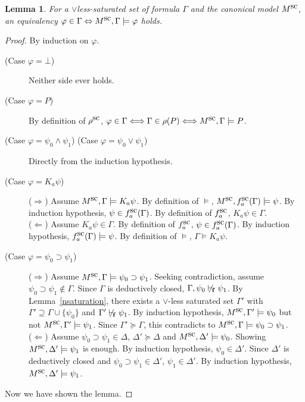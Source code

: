 \documentclass[doctor]{iscs-thesis}
\newtheorem{lemma}{Lemma}
\begin{document}
\begin{lemma}
\label{exactn}
 For a $\vee$less-saturated set of formula $\Gamma$ and the canonical model $M^{\mbox{sc}}$\kern -2pt,
 an equivalency $\varphi\in\Gamma\Leftrightarrow M^{\mbox{sc}}, \Gamma\models\varphi$ holds.
\end{lemma}
\begin{proof}
 By induction on $\varphi$.
\begin{description}
 \item[(Case $\varphi=\bot$)] Neither side ever holds.
 \item[(Case $\varphi =P$)]
	    By definition of $\rho^{\mbox{sc}}$\kern -2pt, 
	    $\varphi\in\Gamma\Longleftrightarrow\Gamma\in\rho(P)\Longleftrightarrow
	    M^{\mbox{sc}},\Gamma\models P$.
 \item[(Case $\varphi = \psi_0\wedge\psi_1$) (Case $\varphi = \psi_0\vee\psi_1$)] 
	    Directly from the induction hypothesis.
 \item[(Case $\varphi ={K_a} \psi$)]
	    \newcommand{\modelion}[2]{\canon M, #1\models #2}
	    ($\Rightarrow$) Assume $\modelion \Gamma {{K_a}\psi}$.
	    By definition of $\models$, $\modelion {\canon f_a(\Gamma)} \psi$.
	    By induction hypothesis, $\psi\in f^{\mbox{sc}}_a(\Gamma)$.
	    By definition of $f^{\mbox{sc}}_a$, ${K_a}\psi\in\Gamma$.\\
	    ($\Leftarrow$)
	    Assume ${K_a}\psi\in\Gamma$.
	    By definition of $f^{\mbox{sc}}_a$, $\psi\in f^{\mbox{sc}}_a(\Gamma)$.
	    By induction hypothesis, $f^{\mbox{sc}}_a(\Gamma)\models \psi$.
	    By definition of $\models$, $\Gamma\models{K_a}\psi$.
 \item[(Case $\varphi = \psi_0\supset\psi_1$)]
	    ($\Rightarrow$) Assume $\modelion \Gamma {\psi_0\supset\psi_1}$.
	    Seeking contradiction, assume $\psi_0\supset\psi_1\notin \Gamma$.
	    Since $\Gamma$ is deductively closed, $\Gamma,\psi_0\not\vdash_{\kern -1pt\mathbf f}\psi_1$.
	    By Lemma~\ref{nsaturation}, there exists a $\vee$-less saturated set $\Gamma'$ with
	    $\Gamma'\supseteq \Gamma\cup \{\psi_0\}$ and $\Gamma'\not\vdash_{\kern -1pt\mathbf f}\psi_1$.
	    By induction hypothesis, $\modelion {\Gamma'} {\psi_0}$ but not
	    $\modelion{\Gamma'}{\psi_1}$.
	    Since $\Gamma'\succeq\Gamma$,
	    this contradicts to $\modelion \Gamma {\psi_0\supset\psi_1}$.\\
	    ($\Leftarrow$)
	    Assume $\psi_0\supset\psi_1\in\Delta$,
	    $\Delta'\succeq \Delta$ and $\modelion {\Delta'}{\psi_0}$.
	    Showing $\modelion {\Delta'}{\psi_1}$ is enough.
	    By induction hypothesis, $\psi_0\in\Delta'$.
	    Since $\Delta'$ is deductively closed and $\psi_0\supset\psi_1\in \Delta'$,
	    $\psi_1\in\Delta'$.
	    By induction hypothesis, $\modelion {\Delta'}{\psi_1}$.
\end{description}
 Now we have shown the lemma.

\end{proof}
\end{document}
